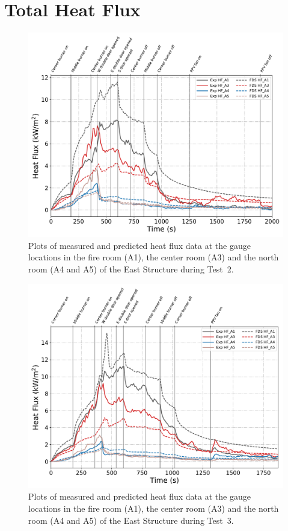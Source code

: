 \clearpage
\section{Total Heat Flux}

\begin{figure}[!h]
	\centering
	\includegraphics[width=\columnwidth]{Figures/Plots/Validation/Heat_Flux/Test_2_HFs}
	\caption[Plots of measured and predicted heat flux data during Test~2.]{Plots of measured and predicted heat flux data at the gauge locations in the fire room (A1), the center room (A3) and the north room (A4 and A5) of the East Structure during Test~2.}
	\label{fig:Test2_HFs}
\end{figure}

\begin{figure}[!h]
	\centering
	\includegraphics[width=\columnwidth]{Figures/Plots/Validation/Heat_Flux/Test_3_HFs}
	\caption[Plots of measured and predicted heat flux data during Test~3.]{Plots of measured and predicted heat flux data at the gauge locations in the fire room (A1), the center room (A3) and the north room (A4 and A5) of the East Structure during Test~3.}
	\label{fig:Test3_HFs}
\end{figure}

